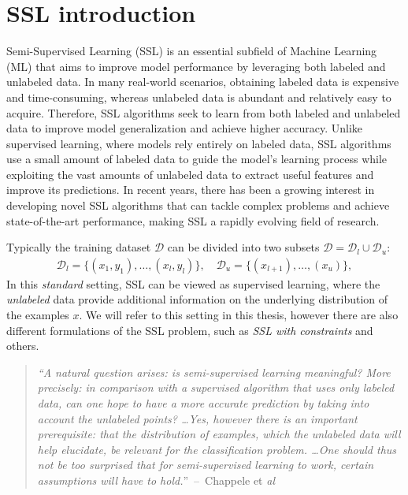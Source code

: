 \section{SSL introduction}
Semi-Supervised Learning (SSL) is an essential subfield of Machine Learning (ML) that aims to improve model performance by leveraging 
both labeled and unlabeled data. In many real-world scenarios, obtaining labeled data is expensive and time-consuming, whereas 
unlabeled data is abundant and relatively easy to acquire. Therefore, SSL algorithms seek to learn from both labeled and unlabeled 
data to improve model generalization and achieve higher accuracy. Unlike supervised learning, where models rely entirely on labeled 
data, SSL algorithms use a small amount of labeled data to guide the model's learning process while exploiting the vast amounts of 
unlabeled data to extract useful features and improve its predictions. In recent years, there has been a growing interest in developing
novel SSL algorithms that can tackle complex problems and achieve state-of-the-art performance, making SSL a rapidly evolving field of 
research. 

Typically the training dataset $\mathcal{D}$ can be divided into two subsets $\mathcal{D} = \mathcal{D}_l \cup \mathcal{D}_u$:
\begin{align*}
    \mathcal{D}_l = \{(x_1,y_1),\dots, (x_l,y_l)\},\quad \mathcal{D}_u = \{(x_{l+1}),\dots,(x_{u})\},
\end{align*}
In this \textit{standard} setting, SSL can be viewed as supervised learning, where 
the \textit{unlabeled} data provide additional information on the underlying distribution of the examples $x$.
We will refer to this setting in this thesis, however there are also different formulations of the SSL problem, such as \textit{SSL with constraints}
and others\cite[p. 1]{ssl-book-2006}.

\begin{quote}
    \textit{
    ``A natural question arises: is semi-supervised learning meaningful? More precisely:
    in comparison with a supervised algorithm that uses only labeled data, can one
    hope to have a more accurate prediction by taking into account the unlabeled
    points? \dots Yes, however there is an important prerequisite: that the
    distribution of examples, which the unlabeled data will help elucidate, be relevant
    for the classification problem.
    \dots One should thus not be too surprised that for semi-supervised learning to work,
    certain assumptions will have to hold.}''~--~Chappele et \textit{al}\cite[p. 4]{ssl-book-2006}
\end{quote}

